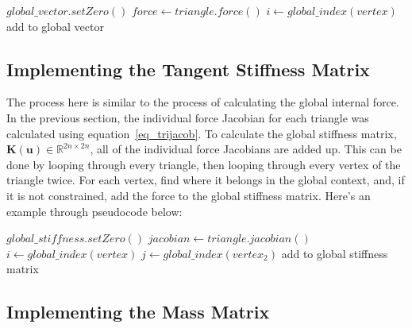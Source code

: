 \documentclass[twocolumn,10pt]{asme2ej}
\begin{document}
\bigskip
\begin{algorithmic}[1]
        \State $global\_vector.setZero()$
         \State $force \gets triangle.force()$
                  \State $i \gets global\_index(vertex)$
                  \State add to global vector
              \EndIf
            \EndFor
        \EndFor
    \EndFunction
\end{algorithmic}

\subsection{Implementing the Tangent Stiffness Matrix}

The process here is similar to the process of calculating the global internal force. In the previous section, the individual force Jacobian for each triangle was calculated using equation~\ref{eq_trijacob}. To calculate the global stiffness matrix, $\bm{K}(\bm{u}) \in \mathbb{R}^{2n \times 2n}$, all of the individual force Jacobians are added up. This can be done by looping through every triangle, then looping through every vertex of the triangle twice. For each vertex, find where it belongs in the global context, and, if it is not constrained, add the force to the global stiffness matrix. Here's an example through pseudocode below:

\bigskip
\begin{algorithmic}[1]
        \State $global\_stiffness.setZero()$
         \State $jacobian \gets triangle.jacobian()$
                  \State $i \gets global\_index(vertex)$
                          \State $j \gets global\_index(vertex_2)$
                          \State add to global stiffness matrix
                      \EndIf
                    \EndFor
              \EndIf
            \EndFor
        \EndFor
    \EndFunction
\end{algorithmic}

\subsection{Implementing the Mass Matrix}
\end{document}

